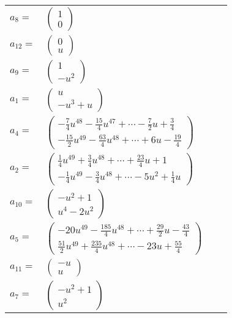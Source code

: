 \documentclass[1p]{elsarticle_modified}
\theoremstyle{definition}
\begin{document}
\begin{tabular}{m{7pt} m{180pt} m{7pt} m{180pt} }
\flushright $a_{8}=$&$\begin{pmatrix}1\\0\end{pmatrix}$ \\
\flushright $a_{12}=$&$\begin{pmatrix}0\\u\end{pmatrix}$ \\
\flushright $a_{9}=$&$\begin{pmatrix}1\\- u^2\end{pmatrix}$ \\
\flushright $a_{1}=$&$\begin{pmatrix}u\\- u^3+u\end{pmatrix}$ \\
\flushright $a_{4}=$&$\begin{pmatrix}-\frac{7}{4} u^{48}-\frac{15}{4} u^{47}+\cdots-\frac{7}{2} u+\frac{3}{4}\\-\frac{15}{2} u^{49}-\frac{63}{4} u^{48}+\cdots+6 u-\frac{19}{4}\end{pmatrix}$ \\
\flushright $a_{2}=$&$\begin{pmatrix}\frac{1}{4} u^{49}+\frac{3}{4} u^{48}+\cdots+\frac{23}{4} u+1\\-\frac{1}{4} u^{49}-\frac{3}{4} u^{48}+\cdots-5 u^2+\frac{1}{4} u\end{pmatrix}$ \\
\flushright $a_{10}=$&$\begin{pmatrix}- u^2+1\\u^4-2 u^2\end{pmatrix}$ \\
\flushright $a_{5}=$&$\begin{pmatrix}-20 u^{49}-\frac{185}{4} u^{48}+\cdots+\frac{29}{2} u-\frac{43}{4}\\\frac{51}{2} u^{49}+\frac{235}{4} u^{48}+\cdots-23 u+\frac{55}{4}\end{pmatrix}$ \\
\flushright $a_{11}=$&$\begin{pmatrix}- u\\u\end{pmatrix}$ \\
\flushright $a_{7}=$&$\begin{pmatrix}- u^2+1\\u^2\end{pmatrix}$ \\

\end{tabular}
\end{document}
